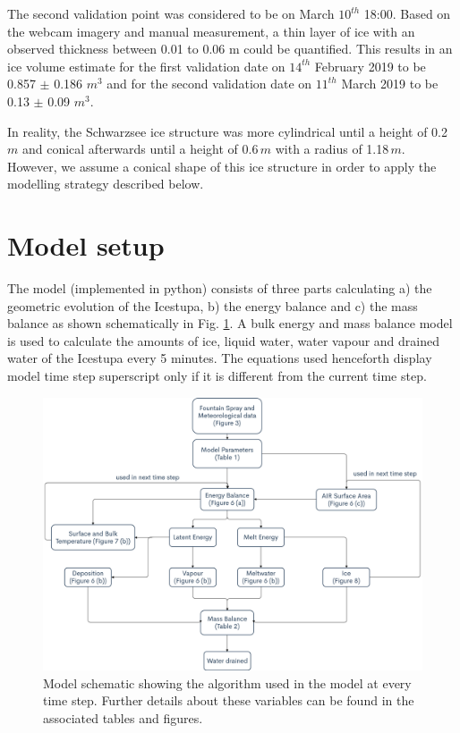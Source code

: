 \documentclass[utf8]{frontiersSCNS} %
\begin{document}
The second validation point was considered to be on March $10^{th}$ 18:00.  Based on the webcam imagery and manual
measurement, a thin layer of ice with an observed thickness between 0.01 to 0.06 m could be quantified. This results in
an ice volume estimate for the first validation date on $14^{th}$ February 2019 to be 0.857 $\pm$ 0.186 $m^{3}$ and for
the second validation date on $11^{th}$ March 2019 to be 0.13 $\pm$ 0.09 $m^{3}$.

In reality, the Schwarzsee ice structure was more cylindrical until a height of 0.2\,$m$ and conical afterwards until a
height of 0.6\,$m$ with a radius of 1.18\,$m$. However, we assume a conical shape of this ice structure in order to
apply the modelling strategy described below.

\section{Model setup}

The model (implemented in python) consists of three parts calculating a) the geometric evolution of the Icestupa, b) the
energy balance and c) the mass balance as shown schematically in Fig. \ref{fig:schema}. A bulk energy and mass balance
model is used to calculate the amounts of ice, liquid water, water vapour and drained water of the Icestupa every 5
minutes. The equations used henceforth display model time step superscript only if it is different from the current time
step.

  \begin{figure} \begin{center} \includegraphics[width=15 cm]{Figures/Figure_4.jpg} \end{center} \caption{Model
schematic showing the algorithm used in the model at every time step. Further details about these variables can be found
in the associated tables and figures.} \label{fig:schema} \end{figure}
  
\end{document}
